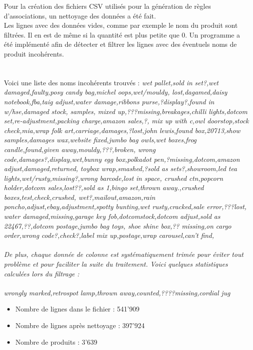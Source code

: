 \documentclass[a4paper]{article}
\begin{document}
Pour la création des fichiers CSV utilisés pour la génération de règles d'associations, un nettoyage des données a été fait.
\\
Les lignes avec des données vides, comme par exemple le nom du produit sont filtrées.
Il en est de même si la quantité est plus petite que 0.
Un programme a été implémenté afin de détecter et filtrer les lignes avec des éventuels noms de produit incohérents.
\\
\\\\
Voici une liste des noms incohérents trouvés :
\textit{wet pallet,sold in set?,wet damaged,faulty,posy candy bag,michel oops,wet/mouldy,
lost,dagamed,daisy notebook,fba,taig adjust,water damage,ribbons purse,?display?,found in w/hse,damaged stock,
samples,
mixed up,???missing,breakages,chilli lights,dotcom set,re-adjustment,packing charge,amazon sales,?,
mix up with c,owl doorstop,stock check,mia,wrap folk art,carriage,damages,?lost,john lewis,found box,20713,show samples,damages wax,website fixed,jumbo bag owls,wet boxes,frog candle,found,given away,mouldy,???,broken,
wrong code,damages?,display,wet,bunny egg box,polkadot pen,?missing,dotcom,amazon adjust,damaged,returned,
toybox  wrap,smashed,?sold as sets?,showroom,led tea lights,wet/rusty,missing?,wrong barcode,lost in space,
crushed ctn,popcorn holder,dotcom sales,lost??,sold as 1,bingo set,thrown away.,crushed boxes,test,check,crushed,
wet?,mailout,amazon,rain poncho,adjust,ebay,adjustment,spotty bunting,wet rusty,cracked,sale error,???lost,
water damaged,missing,garage key fob,dotcomstock,dotcom adjust,sold as 22467,??,dotcom postage,jumbo bag toys,
shoe shine box,?? missing,on cargo order,wrong code?,check?,label mix up,postage,wrap carousel,can't find,
\\\\
De plus, chaque donnée de colonne est systématiquement trimée pour éviter tout problème et pour faciliter la suite du traitement. 
Voici quelques statistiques calculées lors du filtrage :
\\\\
wrongly marked,retrospot lamp,thrown away,counted,????missing,cordial jug}
\begin{itemize}
	\item Nombre de lignes dans le fichier : 541'909
	\item Nombre de lignes après nettoyage : 397'924
	\item Nombre de produits : 3'639
\end{itemize}
\end{document}

